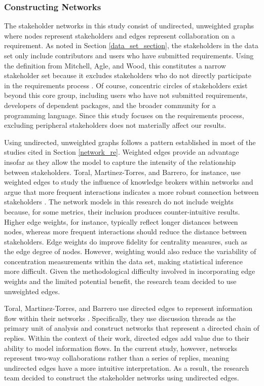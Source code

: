 \subsubsection{Constructing Networks}
\label{network_section}

The stakeholder networks in this study consist of undirected, unweighted graphs where nodes represent stakeholders and edges represent collaboration on a requirement. As noted in Section \ref{data_set_section}, the stakeholders in the data set only include contributors and users who have submitted requirements. Using the definition from Mitchell, Agle, and Wood, this constitutes a narrow stakeholder set because it excludes stakeholders who do not directly participate in the requirements process \cite{mitchell}. Of course, concentric circles of stakeholders exist beyond this core group, including users who have not submitted requirements, developers of dependent packages, and the broader community for a programming language. Since this study focuses on the requirements process, excluding peripheral stakeholders does not materially affect our results.

Using undirected, unweighted graphs follows a pattern established in most of the studies cited in Section \ref{network_re}. Weighted edges provide an advantage insofar as they allow the model to capture the intensity of the relationship between stakeholders. Toral, Martinez-Torres, and Barrero, for instance, use weighted edges to study the influence of knowledge brokers within networks and argue that more frequent interactions indicates a more robust connection between stakeholders \cite{toral}. The network models in this research do not include weights because, for some metrics, their inclusion produces counter-intuitive results. Higher edge weights, for instance, typically reflect longer distances between nodes, whereas more frequent interactions should reduce the distance between stakeholders. Edge weights do improve fidelity for centrality measures, such as the edge degree of nodes. However, weighting would also reduce the variability of concentration measurements within the data set, making statistical inference more difficult. Given the methodological difficulty involved in incorporating edge weights and the limited potential benefit, the research team decided to use unweighted edges.

Toral, Martinez-Torres, and Barrero use directed edges to represent information flow within their networks \cite{toral}. Specifically, they use discussion threads as the primary unit of analysis and construct networks that represent a directed chain of replies. Within the context of their work, directed edges add value due to their ability to model information flows. In the current study, however, networks represent two-way collaborations rather than a series of replies, meaning undirected edges have a more intuitive interpretation. As a result, the research team decided to construct the stakeholder networks using undirected edges.

